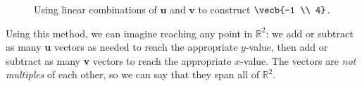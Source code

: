 \begin{figure}[H]
\begin{minipage}{0.48\textwidth}
    \label{fig:reach}
\end{minipage}

\caption{Using linear combinations of $\textbf{u}$ and $\textbf{v}$ to construct $\vecb{-1 \\ 4}$.}
\label{fig:u_v_twopanel}
\end{figure}


Using this method, we can imagine reaching any point in $\mathbb{R}^2$: we add 
or subtract as many \textbf{u} vectors as needed to reach the appropriate 
$y$-value, then add or subtract as many \textbf{v} vectors to reach the 
appropriate $x$-value. The vectors are \emph{not multiples} of each other, so we can say that they span all of $\mathbb{R}^2$. 

